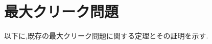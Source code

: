 \documentclass{thesis}
\theoremstyle{definition}
\begin{document}
\section{最大クリーク問題}
\begin{comment}
以下に,既存の$2^{O(\sqrt{m})}$アルゴリズムを示す.
最小次数の頂点$v$を選ぶ.もし$v$の次数が$\sqrt{2m}$以上であるならば
$n \leqq \sqrt{2m}$であるから総当たり法をすると$n2^{O(n)} = n2^{O(\sqrt{m})}$である.
以降の$v$の次数は$\sqrt{2m}$以下であるとする.
$G$中の最大サイズのクリーク$C$を見つける単純なブランチングアルゴリズムを考える.
最小次数の頂点$v$を選んで,(i)$v$が$C$の頂点の一つである場合と
(ii)$v$が$C$の頂点の一つでない場合の二つの部分問題にブランチする.
(i)では,ブルートフォース法を用いて$v$の近傍にある最大サイズのクリーク$C'$を見つける.
$N(v) \leqq \sqrt{2m}$であるから$C'$に入る可能性のある部分集合の個数は多くとも
$2^{\sqrt{2m}}$であり、これが(i)におけるアルゴリズムのステップ数である.
(ii)では,$G$から$v$を削除して再帰的にアルゴリズムを呼び出す.最大$n$回呼び出す可能性がある.
(i)(ii)よりアルゴリズムの合計のステップ数は $n2^{\sqrt{2m}}$であり,アルゴリズムの実行時間は
 $2^{O(\sqrt{m})}$である.
\end{comment}
以下に,既存の最大クリーク問題に関する定理とその証明を示す.
\end{document}
